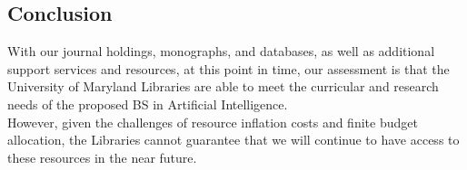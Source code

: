 \subsection*{Conclusion}
With our journal holdings, monographs, and databases, as well as additional support services and resources, at this point in time, our assessment is that the University of Maryland Libraries are able to meet the curricular and research needs of the proposed BS in Artificial Intelligence.\\
However, given the challenges of resource inflation costs and finite budget allocation, the Libraries cannot guarantee that we will continue to have access to these resources in the near future.
